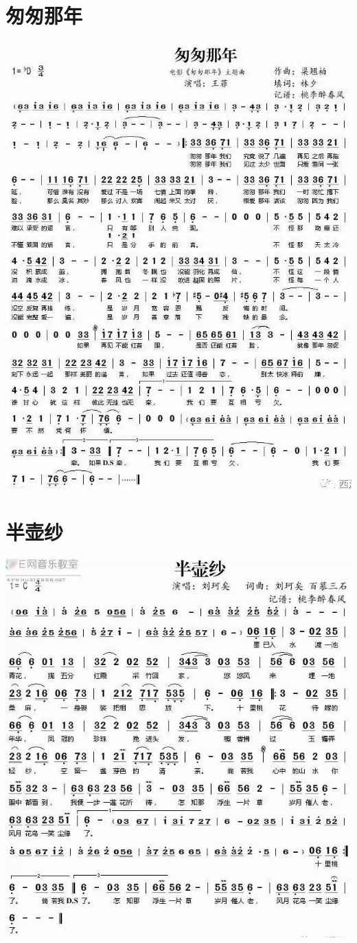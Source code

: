 \documentclass[cn,pad,twocol]{elegantbook}
\begin{document}
\section{匆匆那年}\includegraphics[width=\textwidth]{dongxiao/20200819/匆匆那年.jpeg}
\section{半壶纱}\includegraphics[width=\textwidth]{dongxiao/20200819/半壶纱.jpeg}
\end{document}
